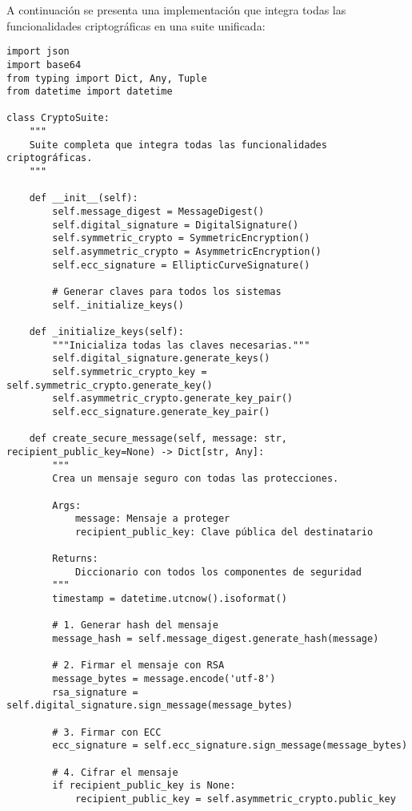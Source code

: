 \documentclass[12pt,a4paper]{article}
\begin{document}
A continuación se presenta una implementación que integra todas las funcionalidades criptográficas en una suite unificada:

\begin{lstlisting}[caption=Suite completa de cifrado integrando todas las funcionalidades]
import json
import base64
from typing import Dict, Any, Tuple
from datetime import datetime

class CryptoSuite:
    """
    Suite completa que integra todas las funcionalidades criptográficas.
    """
    
    def __init__(self):
        self.message_digest = MessageDigest()
        self.digital_signature = DigitalSignature()
        self.symmetric_crypto = SymmetricEncryption()
        self.asymmetric_crypto = AsymmetricEncryption()
        self.ecc_signature = EllipticCurveSignature()
        
        # Generar claves para todos los sistemas
        self._initialize_keys()
        
    def _initialize_keys(self):
        """Inicializa todas las claves necesarias."""
        self.digital_signature.generate_keys()
        self.symmetric_crypto_key = self.symmetric_crypto.generate_key()
        self.asymmetric_crypto.generate_key_pair()
        self.ecc_signature.generate_key_pair()
        
    def create_secure_message(self, message: str, recipient_public_key=None) -> Dict[str, Any]:
        """
        Crea un mensaje seguro con todas las protecciones.
        
        Args:
            message: Mensaje a proteger
            recipient_public_key: Clave pública del destinatario
            
        Returns:
            Diccionario con todos los componentes de seguridad
        """
        timestamp = datetime.utcnow().isoformat()
        
        # 1. Generar hash del mensaje
        message_hash = self.message_digest.generate_hash(message)
        
        # 2. Firmar el mensaje con RSA
        message_bytes = message.encode('utf-8')
        rsa_signature = self.digital_signature.sign_message(message_bytes)
        
        # 3. Firmar con ECC
        ecc_signature = self.ecc_signature.sign_message(message_bytes)
        
        # 4. Cifrar el mensaje
        if recipient_public_key is None:
            recipient_public_key = self.asymmetric_crypto.public_key
            

\end{lstlisting}
\end{document}
